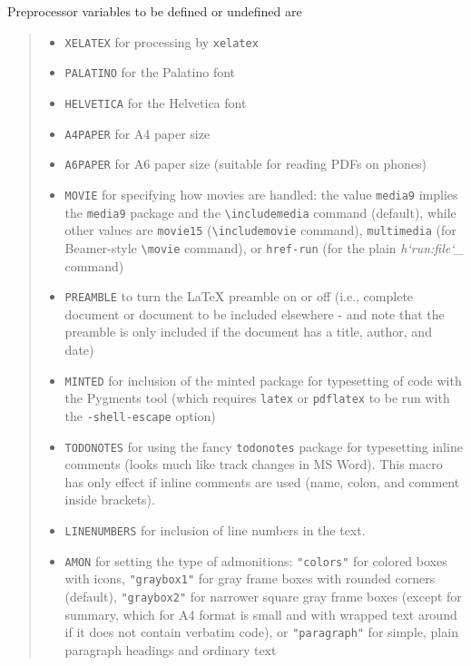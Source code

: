 \documentclass[a4paper]{article}
\providecommand*{\DUroletitlereference}[1]{\textsl{#1}}
\begin{document}
Preprocessor variables to be defined or undefined are
%
\begin{quote}
%
\begin{itemize}

\item \texttt{XELATEX} for processing by \texttt{xelatex}

\item \texttt{PALATINO} for the Palatino font

\item \texttt{HELVETICA} for the Helvetica font

\item \texttt{A4PAPER} for A4 paper size

\item \texttt{A6PAPER} for A6 paper size (suitable for reading PDFs on phones)

\item \texttt{MOVIE} for specifying how movies are handled: the value \texttt{media9}
implies the \texttt{media9} package and the \texttt{\textbackslash{}includemedia} command (default),
while other values are \texttt{movie15} (\texttt{\textbackslash{}includemovie} command),
\texttt{multimedia} (for Beamer-style \texttt{\textbackslash{}movie} command),
or \texttt{href-run} (for the plain \DUroletitlereference{h`run:file`\_} command)

\item \texttt{PREAMBLE} to turn the LaTeX preamble on or off (i.e., complete document
or document to be included elsewhere - and note that
the preamble is only included
if the document has a title, author, and date)

\item \texttt{MINTED} for inclusion of the minted package for typesetting of
code with the Pygments tool (which requires \texttt{latex}
or \texttt{pdflatex} to be run with the \texttt{-shell-escape} option)

\item \texttt{TODONOTES} for using the fancy \texttt{todonotes} package for typesetting
inline comments (looks much like track changes in MS Word). This
macro has only effect if inline comments are used (name, colon,
and comment inside brackets).

\item \texttt{LINENUMBERS} for inclusion of line numbers in the text.

\item \texttt{AMON} for setting the type of admonitions: \texttt{"colors"} for colored
boxes with icons, \texttt{"graybox1"} for gray frame boxes with rounded
corners (default), \texttt{"graybox2"} for narrower square gray frame boxes
(except for summary, which for A4 format is small and with wrapped
text around if it does not contain verbatim code),
or \texttt{"paragraph"} for simple, plain paragraph headings and ordinary text


\end{itemize}
\end{quote}
\end{document}
